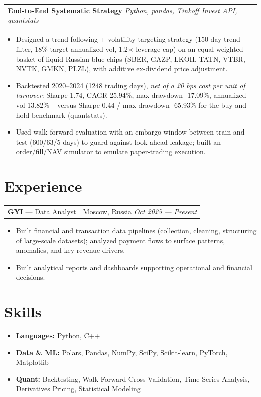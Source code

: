 \documentclass[10pt]{article}
\makeatletter
\newcommand{\smallit}[1]{{\small\textit{#1}}}
\newcommand{\rrow}[2]{%
  \begin{tabularx}{\textwidth}{@{}X r@{}}%
    #1 & #2\\%
  \end{tabularx}%
}
\makeatother
\begin{document}
\rrow{\textbf{End-to-End Systematic Strategy} \; \smallit{Python, pandas, Tinkoff Invest API, quantstats}}{}
\begin{itemize}
  \item Designed a trend-following + volatility-targeting strategy (150-day trend filter, 18\% target annualized vol, 1.2$\times$ leverage cap) on an equal-weighted basket of liquid Russian blue chips (SBER, GAZP, LKOH, TATN, VTBR, NVTK, GMKN, PLZL), with additive ex-dividend price adjustment.
  \item Backtested 2020--2024 (1248 trading days), \emph{net of a 20 bps cost per unit of turnover}: Sharpe 1.74, CAGR 25.94\%, max drawdown -17.09\%, annualized vol 13.82\% -- versus Sharpe 0.44 / max drawdown -65.93\% for the buy-and-hold benchmark (quantstats).
  \item Used walk-forward evaluation with an embargo window between train and test (600/63/5 days) to guard against look-ahead leakage; built an order/fill/NAV simulator to emulate paper-trading execution.
\end{itemize}

\section*{Experience}

\rrow{\textbf{GYI} --- Data Analyst}{Moscow, Russia \; \smallit{Oct 2025 --- Present}}
\begin{itemize}
  \item Built financial and transaction data pipelines (collection, cleaning, structuring of large-scale datasets); analyzed payment flows to surface patterns, anomalies, and key revenue drivers.
  \item Built analytical reports and dashboards supporting operational and financial decisions.
\end{itemize}

\section*{Skills}
\begin{itemize}
\item \textbf{Languages:} Python, C++
\item \textbf{Data \& ML:} Polars, Pandas, NumPy, SciPy, Scikit-learn, PyTorch, Matplotlib
\item \textbf{Quant:} Backtesting, Walk-Forward Cross-Validation, Time Series Analysis, Derivatives Pricing, Statistical Modeling
\end{itemize}
\end{document}
